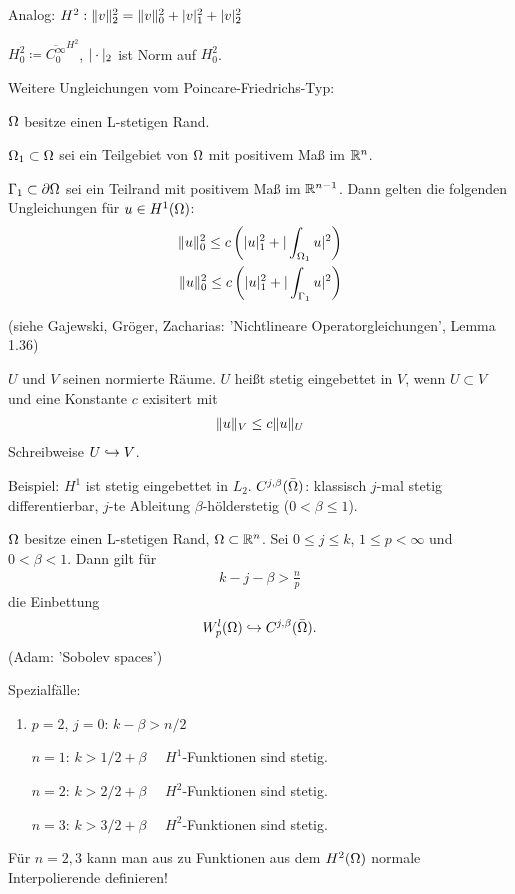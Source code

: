 Analog: $H^2: \|v\|_2^2 = \|v\|_0^2 + |v|_1^2 + |v|_2^2$

$H_0^2 \coloneqq \overline{C_0^\infty}^{H^2}$, $|\cdot|_2$ ist Norm auf $H_0^2$.

Weitere Ungleichungen vom Poincare-Friedrichs-Typ:

$\Omega$ besitze einen L-stetigen Rand. 

$\Omega_1 \subset \Omega$ sei ein Teilgebiet von $\Omega$ mit positivem Maß im $\mathbb{R}^n$.

$\Gamma_1 \subset \partial \Omega$ sei ein Teilrand mit positivem Maß im $\mathbb{R}^{n-1}$.
Dann gelten die folgenden Ungleichungen für $u \in H^1(\Omega)$:
\begin{align*}
\|u\|_0^2 \leq c  \left(|u|_1^2 + |\int_{\Omega_1} u|^2 \right)\\
\|u\|_0^2 \leq c  \left(|u|_1^2 + |\int_{\Gamma_1} u|^2 \right)
\end{align*}

(siehe Gajewski, Gröger, Zacharias: 'Nichtlineare Operatorgleichungen', Lemma 1.36)

\begin{definition}
  $U$ und $V$ seinen normierte Räume. $U$ heißt stetig eingebettet in $V$, wenn $U \subset V$ und eine Konstante $c$ exisitert mit 
  \begin{align*}
    \|u\|_V \leq c \|u\|_U
  \end{align*}
Schreibweise $U \hookrightarrow V$.
\end{definition}
Beispiel: $H^1$ ist stetig eingebettet in $L_2$. 
$C^{j, \beta} (\bar {\Omega})$: klassisch $j$-mal stetig differentierbar, $j$-te Ableitung $\beta$-hölderstetig ($0 <\beta \leq 1$).

\begin{satz}
  $\Omega$ besitze einen L-stetigen Rand, $\Omega \subset \mathbb{R}^n$. Sei $0 \leq j \leq k$, $1 \leq p < \infty$ und $0<\beta <1$. Dann gilt für
  \begin{align*}
    k-j-\beta> \frac{n}{p}
  \end{align*}
die Einbettung 
\begin{align*}
  W_p^l (\Omega) \hookrightarrow C^{j, \beta} (\bar {\Omega}).
\end{align*}
(Adam: 'Sobolev spaces')
\end{satz}
Spezialfälle: 
\renewcommand{\labelenumi}{(\theenumi)}
\begin{enumerate}
\item $p = 2$, $j = 0$: $k -  \beta > n/2$

$n = 1$: $k > 1/2 + \beta \quad$ $H^1$-Funktionen sind stetig. 

$n = 2$: $k > 2/2 + \beta \quad$ $H^2$-Funktionen sind stetig. 

$n = 3$: $k > 3/2 + \beta \quad$ $H^2$-Funktionen sind stetig. 
\end{enumerate}
\begin{folgerung}
  Für $n = 2, 3$ kann man aus zu Funktionen aus dem $H^2(\Omega)$ normale Interpolierende definieren!
\end{folgerung}
